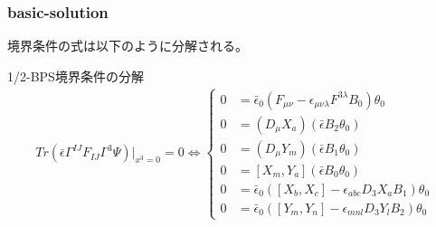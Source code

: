 \documentclass[dvipdfmx,a4paper,10.5pt]{article}
\numberwithin{equation}{section}
\begin{document}
\subsubsection{basic-solution}
境界条件の式は以下のように分解される。
\begin{resultbox}{1/2-BPS境界条件の分解}
    \begin{align*}
        Tr(\bar{\epsilon}\Gamma^{IJ}F_{IJ}\Gamma^{3}\Psi)|_{x^{3}=0}=0
        \iff 
        \begin{cases}
             0&=\bar{\epsilon}_{0}(F_{\mu\nu}-\epsilon_{\mu\nu\lambda}F^{3\lambda}B_{0})\theta_{0}\\
    0&=(D_{\mu}X_{a})(\bar{\epsilon}B_{2}\theta_{0})\\
    0&=(D_{\mu}Y_{m})(\bar{\epsilon}B_{1}\theta_{0})\\
    0&=[X_{m},Y_{a}](\bar{\epsilon}B_{0}\theta_{0})\\
    0&=\bar{\epsilon}_{0}([X_{b},X_{c}]-\epsilon_{abc}D_{3}X_{a}B_{1})\theta_{0}\\
    0&=\bar{\epsilon}_{0}([Y_{m},Y_{n}]-\epsilon_{mnl}D_{3}Y_{l}B_{2})\theta_{0}
        \end{cases}
    \end{align*}
\end{resultbox}
\end{document}
